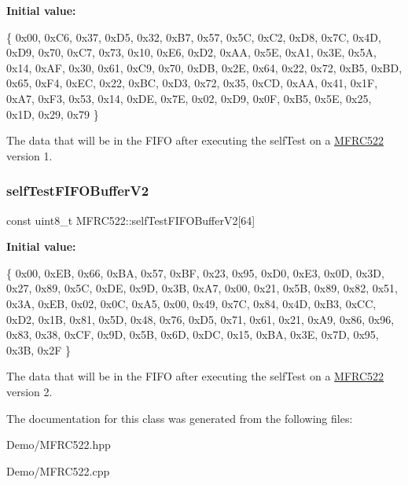 {\bfseries Initial value\+:}
\begin{DoxyCode}
\{
        0x00, 0xC6, 0x37, 0xD5, 0x32, 0xB7, 0x57, 0x5C,
        0xC2, 0xD8, 0x7C, 0x4D, 0xD9, 0x70, 0xC7, 0x73,
        0x10, 0xE6, 0xD2, 0xAA, 0x5E, 0xA1, 0x3E, 0x5A,
        0x14, 0xAF, 0x30, 0x61, 0xC9, 0x70, 0xDB, 0x2E,
        0x64, 0x22, 0x72, 0xB5, 0xBD, 0x65, 0xF4, 0xEC,
        0x22, 0xBC, 0xD3, 0x72, 0x35, 0xCD, 0xAA, 0x41,
        0x1F, 0xA7, 0xF3, 0x53, 0x14, 0xDE, 0x7E, 0x02,
        0xD9, 0x0F, 0xB5, 0x5E, 0x25, 0x1D, 0x29, 0x79
    \}
\end{DoxyCode}


The data that will be in the F\+I\+FO after executing the self\+Test on a \mbox{\hyperlink{class_m_f_r_c522}{M\+F\+R\+C522}} version 1. 

\mbox{\label{class_m_f_r_c522_a6973b73a8a922ac09b9d89489bdbc333}} 
\subsubsection{\texorpdfstring{self\+Test\+F\+I\+F\+O\+Buffer\+V2}{selfTestFIFOBufferV2}}
{\footnotesize\ttfamily const uint8\+\_\+t M\+F\+R\+C522\+::self\+Test\+F\+I\+F\+O\+Buffer\+V2\mbox{[}64\mbox{]}}

{\bfseries Initial value\+:}
\begin{DoxyCode}
\{
        0x00, 0xEB, 0x66, 0xBA, 0x57, 0xBF, 0x23, 0x95,
        0xD0, 0xE3, 0x0D, 0x3D, 0x27, 0x89, 0x5C, 0xDE,
        0x9D, 0x3B, 0xA7, 0x00, 0x21, 0x5B, 0x89, 0x82,
        0x51, 0x3A, 0xEB, 0x02, 0x0C, 0xA5, 0x00, 0x49,
        0x7C, 0x84, 0x4D, 0xB3, 0xCC, 0xD2, 0x1B, 0x81,
        0x5D, 0x48, 0x76, 0xD5, 0x71, 0x61, 0x21, 0xA9,
        0x86, 0x96, 0x83, 0x38, 0xCF, 0x9D, 0x5B, 0x6D,
        0xDC, 0x15, 0xBA, 0x3E, 0x7D, 0x95, 0x3B, 0x2F
    \}
\end{DoxyCode}


The data that will be in the F\+I\+FO after executing the self\+Test on a \mbox{\hyperlink{class_m_f_r_c522}{M\+F\+R\+C522}} version 2. 



The documentation for this class was generated from the following files\+:\begin{DoxyCompactItemize}
\item 
Demo/M\+F\+R\+C522.\+hpp\item 
Demo/M\+F\+R\+C522.\+cpp\end{DoxyCompactItemize}
